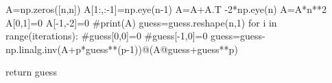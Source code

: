     A=np.zeros([n,n])
    A[1:,:-1]=np.eye(n-1)
    A=A+A.T -2*np.eye(n)
    A=A*n**2
    A[0,1]=0
    A[-1,-2]=0
    #print(A)
    guess=guess.reshape(n,1)
    for i in range(iterations):
        #guess[0,0]=0
        #guess[-1,0]=0
        guess=guess-np.linalg.inv(A+p*guess**(p-1))@(A@guess+guess**p)

    return guess